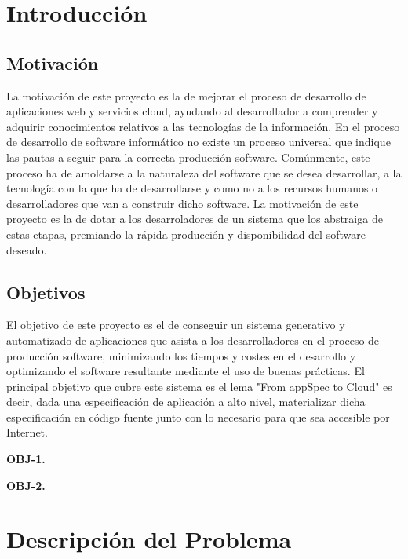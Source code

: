 \documentclass[a4paper,11pt]{book}
\begin{document}



\tableofcontents
\listoffigures

%

%



\chapter{Introducción}

\section{Motivación}

La motivación de este proyecto es la de mejorar el proceso de desarrollo de aplicaciones web y servicios cloud, ayudando al desarrollador a comprender y adquirir conocimientos relativos a las tecnologías de la información.  En el proceso de desarrollo de software informático no existe un proceso universal que indique las pautas a seguir para la correcta producción software. Comúnmente, este proceso ha de amoldarse a la naturaleza del software que se desea desarrollar, a la tecnología con la que ha de desarrollarse y como no a los recursos humanos o desarrolladores que van a construir dicho software. La motivación de este proyecto es la de dotar a los desarroladores de un sistema que los abstraiga de estas etapas, premiando la rápida producción y disponibilidad del software deseado. 

\section{Objetivos}
El objetivo de este proyecto es el de conseguir un sistema generativo y automatizado de aplicaciones que asista a los desarrolladores en el proceso de producción software, minimizando los tiempos y costes en el desarrollo y optimizando el software resultante mediante el uso de buenas prácticas. El principal objetivo que cubre este sistema es el lema "From appSpec to Cloud" es decir, dada una especificación de aplicación a alto nivel, materializar dicha especificación en código fuente junto con lo necesario para que sea accesible por Internet. 

\textbf{OBJ-1.} 

\textbf{OBJ-2.}

\chapter{Descripción del Problema}
\end{document}
